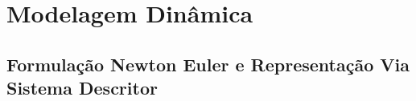 \documentclass[a4paper,10pt]{article}
\begin{document}
%
%

\newcommand{\surname}{RAFFO}

\newcommand{\initials}{JMC}

\newcommand{\reportnumber}{1}

\newcommand{\reportversion}{1}

\newcommand{\reporttitle}{\textbf{Parallel Distributed Control(PDC) de um Pendulo Invertido Via Representação Takagi-Sugeno}}

\newcommand{\registrationnumber}{2016086496}

\newcommand{\studentname}{Jonatan Mota Campos}

\newcommand{\advisorname}{Guilherme Vianna Raffo}

\newcommand{\coadvisorname}{}



\newpage
\tableofcontents
\thispagestyle{empty}

\newpage
{}
\newcommand{\zero}{\bm{\emptyset}}

\section{Modelagem Dinâmica}
\subsection{Formulação Newton Euler e Representação Via Sistema Descritor}
\end{document}
